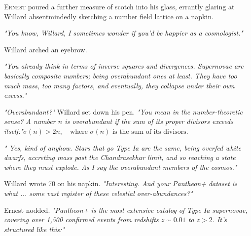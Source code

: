 \lettrine{E}{rnest} poured a further measure of scotch into his glass, errantly glaring at Willard absentmindedly sketching a number field lattice on a napkin.

\textit{"You know, Willard, I sometimes wonder if you'd be happier as a cosmologist."}

Willard arched an eyebrow. 

\textit{"You already think in terms of inverse squares and divergences. Supernovae are basically composite numbers; being overabundant ones at least. They have too much mass, too many factors, and eventually, they collapse under their own excess."}

\textit{"Overabundant?"} Willard set down his pen. \textit{"You mean in the number-theoretic sense? A number $n$ is overabundant if the sum of its proper divisors exceeds itself:"}\(
    \sigma(n) > 2n, \quad \text{where } \sigma(n) \text{ is the sum of its divisors.}
\)

\textit{" Yes, kind of anyhow. Stars that go Type Ia are the same, being overfed white dwarfs, accreting mass past the Chandrasekhar limit, and so reaching a state where they must explode. As I say the overabundant members of the cosmos."}

Willard wrote 70 on his napkin. \textit{"Interesting. And your Pantheon+ dataset is what ... some vast register of these celestial over-abundances?"}

Ernest nodded. \textit{"Pantheon+ is the most extensive catalog of Type Ia supernovae, covering over 1,500 confirmed events from redshifts $z \sim 0.01$ to $z > 2$. It's structured like this:"}

